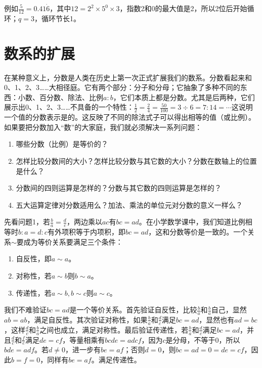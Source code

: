 \documentclass[b5paper]{ctexart}
\begin{document}
例如$\frac{5}{12} = 0.41\dot{6}$，其中$12 = 2^2 \times 5^0 \times 3$，指数2和0的最大值是2，所以2位后开始循环；$q = 3$，循环节长1。

\section{数系的扩展}
在某种意义上，分数是人类在历史上第一次正式扩展我们的数系。分数看起来和0、1、2、3……大相径庭。它有两个部分：分子和分母；它抽象了多种不同的东西：小数、百分数、除法、比例$a:b$，它们本质上都是分数。尤其是后两种，它们展示出0、1、2、3……不具备的一个特性：$\frac{1}{2} = \frac{2}{4} = \frac{50}{100} = 3 \div 6 = 7:14 = \cdots$这说明一个值的分数表示是的。这反映了不同的除法式子可以得出相等的值（或比例）。如果要把分数加入“数”的大家庭，我们就必须解决一系列问题：

\begin{enumerate}[问题1.]
\item 哪些分数（比例）是等价的？
\item 怎样比较分数间的大小？怎样比较分数与其它数的大小？分数在数轴上的位置是什么？
\item 分数间的四则运算是怎样的？分数与其它数的四则运算是怎样的？
\item 五大运算定律对分数适用么？加法、乘法的单位元对分数的意义一样么？
\end{enumerate}

先看问题1，若$\frac{b}{a} = \frac{d}{c}$，两边乘以$ac$有$bc = ad$。在小学数学课中，我们知道比例相等时$b : a = d : c$有外项积等于内项积，即$bc = ad$，这和分数等价是一致的。一个关系$\sim$要成为等价关系要满足三个条件：

\begin{enumerate}[条件1.]
\item 自反性，即$a \sim a$。
\item 对称性，若$a \sim b$则$b \sim a$。
\item 传递性，若$a \sim b, b \sim c$则$a \sim c$。
\end{enumerate}

我们不难验证$bc = ad$是一个等价关系。首先验证自反性，比较$\frac{b}{a}$和$\frac{b}{a}$自己，显然$ab = ab$，满足自反性。其次验证对称性，如果$\frac{b}{a}$和$\frac{d}{c}$满足$bc = ad$，显然也有$ad = bc$，这样$\frac{d}{c}$和$\frac{b}{a}$之间也成立，满足对称性。最后验证传递性，若$\frac{b}{a}$和$\frac{d}{c}$满足$bc = ad$，并且$\frac{d}{c}$和$\frac{f}{e}$满足$de = cf$，等量相乘有$bcde = adcf$，因为$c$是分母，不等于0，所以$bde = adf$。若$d \ne 0$，进一步有$be = af$；否则$d = 0$，则$bc = ad = 0 = de = cf$，因此$b = f = 0$，同样有$be = af$。满足传递性。
\end{document}
